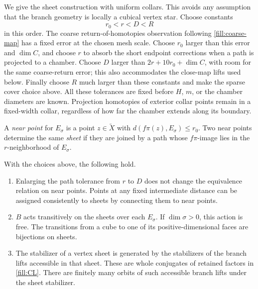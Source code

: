 We give the sheet construction with uniform collars.  This avoids any
assumption that the branch geometry is locally a cubical vertex star.
Choose constants
\begin{equation}
 r_0<r<D<R
 \label{fill:tolerances}
\end{equation}
in this order. The coarse return-of-homotopies observation following
\eqref{fill:coarse-map} has a fixed error at the chosen mesh scale.
Choose \(r_0\) larger than this error and \(\dim C\), and choose \(r\)
to absorb the short endpoint corrections when a path is projected to
a chamber. Choose \(D\) larger than \(2r+10r_0+\dim C\), with room
for the same coarse-return error; this also accommodates the close-map
lifts used below. Finally choose \(R\) much larger than these constants
and make the sparse cover choice above. All these tolerances are fixed
before \(H\), \(m\), or the chamber diameters are known. Projection
homotopies of exterior collar points remain in a fixed-width collar,
regardless of how far the chamber extends along its boundary.

A \emph{near point} for \(E_\sigma\) is a point \(z\in\widetilde X\) with
\(d(f\pi(z),E_\sigma)\le r_0\).  Two near points determine the same
\emph{sheet} if they are joined by a path whose \(f\pi\)-image lies in the
\(r\)-neighborhood of \(E_\sigma\).

\begin{lemma}\label{fill:sheets}
With the choices above, the following hold.
\begin{enumerate}[label=\textup{(\roman*)}]
\item Enlarging the path tolerance from \(r\) to \(D\) does not change the
equivalence relation on near points.  Points at any fixed intermediate
distance can be assigned consistently to sheets by connecting them to
near points.
\item \(B\) acts transitively on the sheets over each \(E_\sigma\).
If \(\dim\sigma>0\), this action is free.  The transitions from a cube
to one of its positive-dimensional faces are bijections on sheets.
\item The stabilizer of a vertex sheet is generated by the stabilizers
of the branch lifts accessible in that sheet.  These are whole conjugates
of retained factors in \eqref{fill:CL}.  There are finitely many orbits
of such accessible branch lifts under the sheet stabilizer.
\end{enumerate}
\end{lemma}

